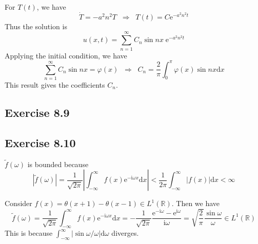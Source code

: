 \documentclass[]{ctexart}
\begin{document}
For $T(t)$, we have 
\begin{equation*}
\dot T=-a^2n^2T\;\;\Rightarrow\;\;T(t)=C\mathrm{e}^{-a^2 n^2 t}
\end{equation*}
Thus the solution is 
\begin{equation*}
u(x,t)=\sum_{n=1}^\infty C_n\sin nx\;\mathrm{e}^{-a^2n^2 t}
\end{equation*}
Applying the initial condition, we have 
\begin{equation*}
\sum_{n=1}^\infty C_n\sin nx=\varphi(x)\;\;\Rightarrow\;\;C_n=\frac{2}{\pi}\int_0^\pi\varphi(x)\sin nx\mathrm{d}x
\end{equation*}
This result gives the coefficients $C_n$. 
\subsection{Exercise 8.9}
\subsection{Exercise 8.10}
$\tilde{f}(\omega)$ is bounded because 
\begin{equation*}
|\tilde{f}(\omega)|=\frac{1}{\sqrt{2\pi}}\left|\int_{-\infty}^\infty f(x)\mathrm{e}^{-\mathrm{i}\omega x}\mathrm{d}x\right|<\frac{1}{2\pi}\int_{-\infty}^\infty |f(x)|\mathrm{d}x<\infty
\end{equation*}


Consider $f(x)=\theta(x+1)-\theta(x-1)\in L^1(\mathbb R)$. Then we have 
\begin{equation*}
\tilde{f}(\omega)=\frac{1}{\sqrt{2\pi}}\int_{-\infty}^\infty f(x)\mathrm{e}^{-\mathrm{i}\omega x}\mathrm{d}x=-\frac{1}{\sqrt{2\pi}}\frac{\mathrm{e}^{-\mathrm{i}\omega}-\mathrm{e}^{\mathrm{i}\omega}}{\mathrm{i}\omega}=\sqrt{\frac{2}{\pi}}\frac{\sin\omega}{\omega}\in L^1(\mathbb R)
\end{equation*}
This is because $\int_{-\infty}^\infty|\sin\omega/\omega|\mathrm{d}\omega$ diverges. 
\end{document}
